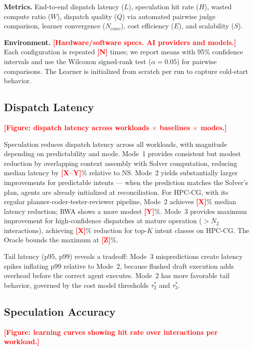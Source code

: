 \documentclass[conference,10pt]{IEEEtran}
\newcommand{\placeholder}[1]{\textcolor{red}{\textbf{[#1]}}}
\begin{document}
\textbf{Metrics.}
End-to-end dispatch latency ($L$), speculation hit rate ($H$), wasted compute ratio ($W$), dispatch quality ($Q$) via automated pairwise judge comparison, learner convergence ($N_{conv}$), cost efficiency ($E$), and scalability ($S$).

\textbf{Environment.} \placeholder{Hardware/software specs. AI providers and models.} Each configuration is repeated \placeholder{N} times; we report means with 95\% confidence intervals and use the Wilcoxon signed-rank test ($\alpha = 0.05$) for pairwise comparisons. The Learner is initialized from scratch per run to capture cold-start behavior.

\subsection{Dispatch Latency}

\placeholder{Figure: dispatch latency across workloads $\times$ baselines $\times$ modes.}

Speculation reduces dispatch latency across all workloads, with magnitude depending on predictability and mode.
Mode~1 provides consistent but modest reduction by overlapping context assembly with Solver computation, reducing median latency by \placeholder{X--Y}\% relative to NS.
Mode~2 yields substantially larger improvements for predictable intents --- when the prediction matches the Solver's plan, agents are already initialized at reconciliation.
For HPC-CG, with its regular planner-coder-tester-reviewer pipeline, Mode~2 achieves \placeholder{X}\% median latency reduction; RWA shows a more modest \placeholder{Y}\%.
Mode~3 provides maximum improvement for high-confidence dispatches at mature operation ($> N_2$ interactions), achieving \placeholder{X}\% reduction for top-$K$ intent classes on HPC-CG. The Oracle bounds the maximum at \placeholder{Z}\%.

Tail latency (p95, p99) reveals a tradeoff: Mode~3 mispredictions create latency spikes inflating p99 relative to Mode~2, because flushed draft execution adds overhead before the correct agent executes. Mode~2 has more favorable tail behavior, governed by the cost model thresholds $\tau_2^*$ and $\tau_3^*$.

\subsection{Speculation Accuracy}

\placeholder{Figure: learning curves showing hit rate over interactions per workload.}
\end{document}
